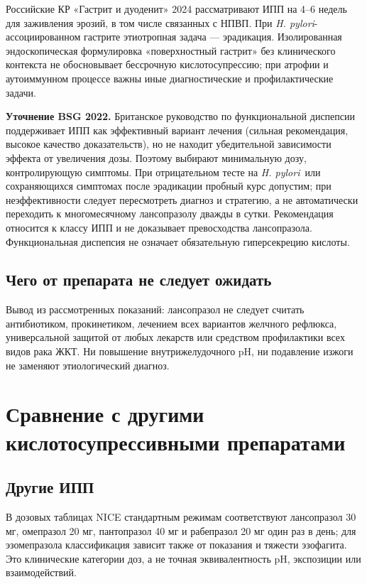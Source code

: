\documentclass[11pt,a4paper,notitlepage]{report}
\newcommand{\Hp}{\textit{H. pylori}}
\newcommand{\src}[1]{\unskip\space\cite{#1}}
\begin{document}
Российские КР «Гастрит и дуоденит» 2024 рассматривают ИПП на 4--6 недель для заживления эрозий, в том числе связанных с НПВП. При \Hp-ассоциированном гастрите этиотропная задача --- эрадикация. Изолированная эндоскопическая формулировка «поверхностный гастрит» без клинического контекста не обосновывает бессрочную кислотосупрессию; при атрофии и аутоиммунном процессе важны иные диагностические и профилактические задачи.\src{rfgastrit}

\textbf{Уточнение BSG 2022.} Британское руководство по функциональной диспепсии поддерживает ИПП как эффективный вариант лечения (сильная рекомендация, высокое качество доказательств), но не находит убедительной зависимости эффекта от увеличения дозы. Поэтому выбирают минимальную дозу, контролирующую симптомы. При отрицательном тесте на \Hp\ или сохраняющихся симптомах после эрадикации пробный курс допустим; при неэффективности следует пересмотреть диагноз и стратегию, а не автоматически переходить к многомесячному лансопразолу дважды в сутки. Рекомендация относится к классу ИПП и не доказывает превосходства лансопразола. Функциональная диспепсия не означает обязательную гиперсекрецию кислоты.\src{bsgfd}

\subsection{Чего от препарата не следует ожидать}
Вывод из рассмотренных показаний: лансопразол не следует считать антибиотиком, прокинетиком, лечением всех вариантов желчного рефлюкса, универсальной защитой от любых лекарств или средством профилактики всех видов рака ЖКТ. Ни повышение внутрижелудочного pH, ни подавление изжоги не заменяют этиологический диагноз.\src{uslabel,agagerd,rfgastrit}

\section{Сравнение с другими кислотосупрессивными препаратами}

\subsection{Другие ИПП}
В дозовых таблицах NICE стандартным режимам соответствуют лансопразол 30 мг, омепразол 20 мг, пантопразол 40 мг и рабепразол 20 мг один раз в день; для эзомепразола классификация зависит также от показания и тяжести эзофагита. Это клинические категории доз, а не точная эквивалентность pH, экспозиции или взаимодействий.\src{nice}
\end{document}
